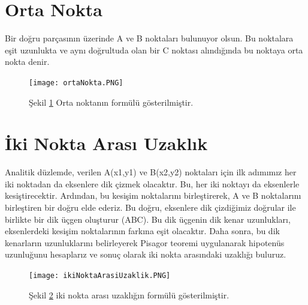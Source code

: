 \documentclass[12pt, a4paper]{article}
\begin{document}
\section{Orta Nokta }
Bir doğru parçasının üzerinde A ve B noktaları bulunuyor olsun. Bu noktalara eşit uzunlukta ve aynı doğrultuda olan bir C noktası alındığında bu noktaya orta nokta denir.

\begin{figure}[!ht]
	\caption{}
	\centering
	\texttt{[image: ortaNokta.PNG]}
	\label{OrtaNokta}
	
	
	Şekil \ref{OrtaNokta} Orta noktanın formülü gösterilmiştir.	
	
	
	
\end{figure}


\section{İki Nokta Arası Uzaklık }
Analitik düzlemde, verilen A(x1,y1) ve B(x2,y2) noktaları için ilk adımımız her iki noktadan da eksenlere dik çizmek olacaktır. Bu, her iki noktayı da eksenlerle kesiştirecektir. Ardından, bu kesişim noktalarını birleştirerek, A ve B noktalarını birleştiren bir doğru elde ederiz. Bu doğru, eksenlere dik çizdiğimiz doğrular ile birlikte bir dik üçgen oluşturur (ABC). Bu dik üçgenin dik kenar uzunlukları, eksenlerdeki kesişim noktalarının farkına eşit olacaktır. Daha sonra, bu dik kenarların uzunluklarını belirleyerek Pisagor teoremi uygulanarak hipotenüs uzunluğunu hesaplarız ve sonuç olarak iki nokta arasındaki uzaklığı buluruz.

\begin{figure}[!ht]
	\caption{}
	\centering
	\texttt{[image: ikiNoktaArasiUzaklik.PNG]}
	\label{ikiNoktaArasiUzaklık}
	
	
	Şekil \ref{ikiNoktaArasiUzaklık} iki nokta arası uzaklığın formülü gösterilmiştir.	
	
	
	
\end{figure}
\newpage
\end{document}
